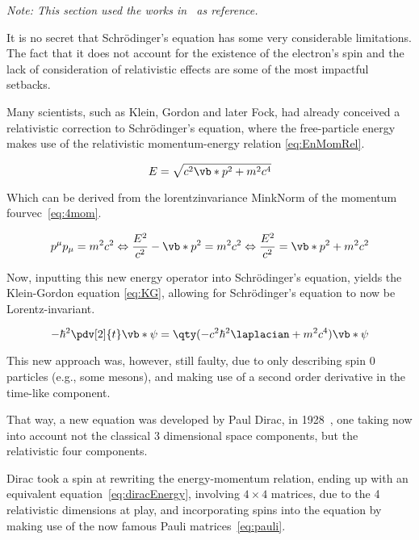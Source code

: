\textit{Note: This section used the works in~\cite{Thaller1992,Beyer2016,Sakurai2020,Bethe1977} as reference.}


It is no secret that Schrödinger's equation has some very considerable limitations. The fact that it does not account for the existence of the electron's spin and the lack of consideration of relativistic effects are some of the most impactful setbacks.




Many scientists, such as Klein, Gordon and later Fock, had already conceived a relativistic correction to Schrödinger's equation, where the free-particle energy makes use of the relativistic momentum-energy relation \eqref{eq:EnMomRel}.


 \begin{equation}
    E=\sqrt{c^2\vb*{p}^2+m^2c^4}
    \label{eq:EnMomRel}
 \end{equation}


 Which can be derived from the \gls{lorentzinvariance} \gls{MinkNorm} of the momentum \gls{fourvec}~\eqref{eq:4mom}.


 \begin{equation}
    p^\mu p_\mu = m^2c^2\Leftrightarrow\dfrac{E^2}{c^2}-\vb*{p}^2=m^2c^2 \Leftrightarrow  \dfrac{E^2}{c^2}= \vb*{p}^2 +m^2c^2
    \label{eq:4mom}
\end{equation}

 Now, inputting this new energy operator into Schrödinger's equation, yields the Klein-Gordon equation \eqref{eq:KG}, allowing for Schrödinger's equation to now be Lorentz-invariant.

 \begin{equation}
    -\hbar^2 \pdv[2]{t} \vb*{\psi}=\qty(-c^2\hbar^2\laplacian + m^2c^4)\vb*{\psi}
    \label{eq:KG}
\end{equation}



 This new approach was, however, still faulty, due to only describing spin 0 particles (e.g., some mesons), and making use of a second order derivative in the time-like component.

 That way, a new equation was developed by Paul Dirac, in 1928~\cite{Dirac}, one taking now into account not the classical 3 dimensional space components, but the relativistic four components.




 Dirac took a spin  at rewriting the energy-momentum relation, ending up with an equivalent equation~\eqref{eq:diracEnergy}, involving $4\times 4$ matrices, due to the 4 relativistic dimensions at play, and incorporating spins into the equation by making use of the now famous Pauli matrices~\eqref{eq:pauli}.

